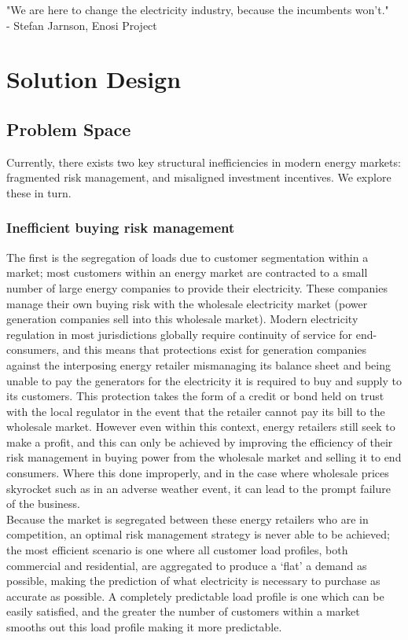 \documentclass{article}
\theoremstyle{definition}
\theoremstyle{plain} %
\begin{document}
\noindent "We are here to change the electricity industry, because the incumbents won’t."\\
- Stefan Jarnson, Enosi Project




\pagebreak
\section{Solution Design}

\subsection{Problem Space}

Currently, there exists two key structural inefficiencies in modern energy markets: fragmented risk management, and misaligned investment incentives. We explore these in turn.

\subsubsection{Inefficient buying risk management}

The first is the segregation of loads due to customer segmentation within a market; most customers within an energy market are contracted to a small number of large energy companies to provide their electricity. These companies manage their own buying risk with the wholesale electricity market (power generation companies sell into this wholesale market). Modern electricity regulation in most jurisdictions globally require continuity of service for end-consumers, and this means that protections exist for generation companies against the interposing energy retailer mismanaging its balance sheet and being unable to pay the generators for the electricity it is required to buy and supply to its customers. This protection takes the form of a credit or bond held on trust with the local regulator in the event that the retailer cannot pay its bill to the wholesale market. However even within this context, energy retailers still seek to make a profit, and this can only be achieved by improving the efficiency of their risk management in buying power from the wholesale market and selling it to end consumers. Where this done improperly, and in the case where wholesale prices skyrocket such as in an adverse weather event, it can lead to the prompt failure of the business.\\

\noindent Because the market is segregated between these energy retailers who are in competition, an optimal risk management strategy is never able to be achieved; the most efficient scenario is one where all customer load profiles, both commercial and residential, are aggregated to produce a ‘flat’ a demand as possible, making the prediction of what electricity is necessary to purchase as accurate as possible. A completely predictable load profile is one which can be easily satisfied, and the greater the number of customers within a market smooths out this load profile making it more predictable.
\end{document}
